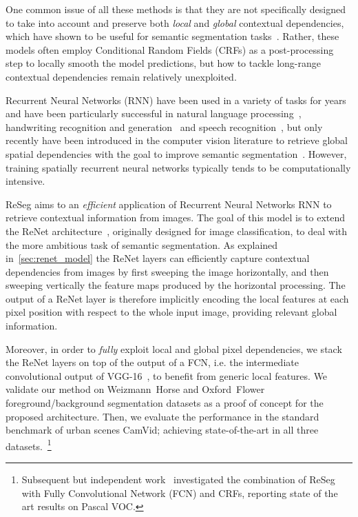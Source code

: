 One common issue of all these methods is that they are not specifically
designed to take into account and preserve both \emph{local} and \emph{global}
contextual dependencies, which have shown to be useful for semantic
segmentation tasks~\cite{Singh2013,Gatta14-deepvision}. Rather, these models
often employ Conditional Random Fields (CRFs) as a post-processing step to
locally smooth the model predictions, but how to tackle long-range contextual
dependencies remain relatively unexploited.

Recurrent Neural Networks (RNN) have been used in a variety of tasks for years
and have been particularly successful in natural language
processing~\citep[see, e.g.,][]{Mikolov-thesis-2012,Sutskever-et-al-NIPS2014,
Cho2014}, handwriting recognition and generation~\citep{Graves+Schmidhuber-2009,
Graves-et-al-NIPS2007,Graves-arxiv2013} and speech recognition~\citep{
Chorowski-et-al-arxiv2014,Graves+Jaitly-ICML2014}, but only recently have been
introduced in the computer vision literature to retrieve global spatial
dependencies with the goal to improve semantic
segmentation~\cite{Pinheiro:2014, Gatta14-deepvision, chen2015semantic,
byeon2015scene}. However, training spatially recurrent neural networks
typically tends to be computationally intensive.

ReSeg aims to an {\em efficient} application of Recurrent Neural Networks RNN
to retrieve contextual information from images. The goal of this model is to
extend the ReNet architecture~\cite{visin2015renet}, originally designed for
image classification, to deal with the more ambitious task of semantic
segmentation. As explained in~\autoref{sec:renet_model} the ReNet layers can
efficiently capture contextual dependencies from images by first sweeping the
image horizontally, and then sweeping vertically the feature maps produced by
the horizontal processing. The output of a ReNet layer is therefore implicitly
encoding the local features at each pixel position with respect to the whole
input image, providing relevant global information.

Moreover, in order to {\em fully} exploit local and global pixel dependencies,
we stack the
ReNet layers on top of the output of a FCN, i.e. the intermediate convolutional
output of VGG-16~\cite{Simonyan2015}, to benefit from generic local features.
We validate our method on Weizmann~Horse and Oxford~Flower
foreground/background segmentation datasets as a proof of concept for the
proposed architecture.  Then, we evaluate the performance in the standard
benchmark of urban scenes CamVid; achieving state-of-the-art in all three
datasets.~\footnote{Subsequent but independent
work~\cite{DBLP:journals/corr/YanZJBY16} investigated the combination of ReSeg
with Fully Convolutional Network (FCN) and CRFs, reporting state of the art
results on Pascal VOC.}

